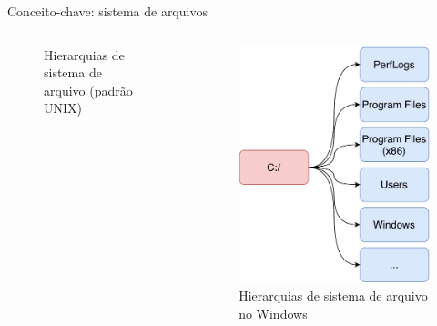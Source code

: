 \begin{frame}{Conceito-chave: sistema de arquivos}
\begin{columns}
\begin{column}{0.5\textwidth}
\begin{figure}
        \caption{Hierarquias de sistema de arquivo (padrão UNIX)}
        \label{fig:my_label}
    \end{figure}
    \end{column}
    \begin{column}{0.5\textwidth}
    \begin{figure}
        \centering
        \includegraphics[scale=0.4]{figuras/windows.pdf}
        \caption{Hierarquias de sistema de arquivo no Windows}
        \label{fig:my_label}
    \end{figure}
    \end{column}
    
    \end{columns}
\end{frame}




 
